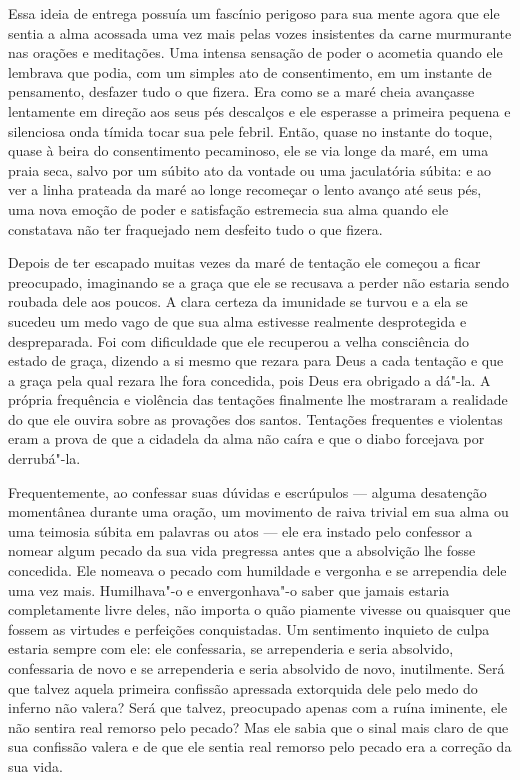 Essa ideia de entrega possuía um fascínio perigoso para sua mente agora
que ele sentia a alma acossada uma vez mais pelas vozes insistentes da
carne murmurante nas orações e meditações. Uma intensa sensação de
poder o acometia quando ele lembrava que podia, com um simples ato de
consentimento, em um instante de pensamento, desfazer tudo o que
fizera. Era como se a maré cheia avançasse lentamente em direção aos
seus pés descalços e ele esperasse a primeira pequena e silenciosa onda
tímida tocar sua pele febril. Então, quase no instante do toque, quase
à beira do consentimento pecaminoso, ele se via longe da maré, em uma
praia seca, salvo por um súbito ato da vontade ou uma jaculatória
súbita: e ao ver a linha prateada da maré ao longe recomeçar o lento
avanço até seus pés, uma nova emoção de poder e satisfação estremecia
sua alma quando ele constatava não ter fraquejado nem desfeito tudo o
que fizera.

Depois de ter escapado muitas vezes da maré de tentação ele começou a
ficar preocupado, imaginando se a graça que ele se recusava a perder
não estaria sendo roubada dele aos poucos. A clara certeza da imunidade
se turvou e a ela se sucedeu um medo vago de que sua alma estivesse
realmente desprotegida e despreparada. Foi com dificuldade que ele
recuperou a velha consciência do estado de graça, dizendo a si mesmo
que rezara para Deus a cada tentação e que a graça pela qual rezara lhe
fora concedida, pois Deus era obrigado a dá"-la. A própria frequência e
violência das tentações finalmente lhe mostraram a realidade do que ele
ouvira sobre as provações dos santos. Tentações frequentes e violentas
eram a prova de que a cidadela da alma não caíra e que o diabo
forcejava por derrubá"-la.

Frequentemente, ao confessar suas dúvidas e escrúpulos --- alguma
desatenção momentânea durante uma oração, um movimento de raiva trivial
em sua alma ou uma teimosia súbita em palavras ou atos --- ele era
instado pelo confessor a nomear algum pecado da sua vida pregressa
antes que a absolvição lhe fosse concedida. Ele nomeava o pecado com
humildade e vergonha e se arrependia dele uma vez mais. Humilhava"-o e
envergonhava"-o saber que jamais estaria completamente livre deles, não
importa o quão piamente vivesse ou quaisquer que fossem as virtudes e
perfeições conquistadas. Um sentimento inquieto de culpa estaria sempre
com ele: ele confessaria, se arrependeria e seria absolvido,
confessaria de novo e se arrependeria e seria absolvido de novo,
inutilmente. Será que talvez aquela primeira confissão apressada
extorquida dele pelo medo do inferno não valera? Será que
talvez, preocupado apenas com a ruína iminente, ele não sentira
real remorso pelo pecado? Mas ele sabia que o sinal mais claro de que
sua confissão valera e de que ele sentia real remorso pelo pecado era a
correção da sua vida.

